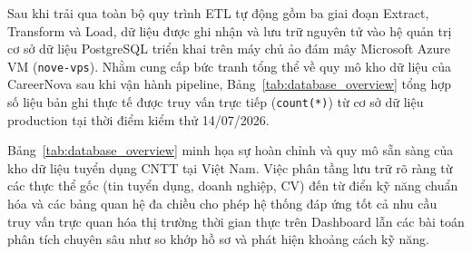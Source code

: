 Sau khi trải qua toàn bộ quy trình ETL tự động gồm ba giai đoạn Extract, Transform và Load, dữ liệu được ghi nhận và lưu trữ nguyên tử vào hệ quản trị cơ sở dữ liệu PostgreSQL triển khai trên máy chủ ảo đám mây Microsoft Azure VM (\texttt{nove-vps}). Nhằm cung cấp bức tranh tổng thể về quy mô kho dữ liệu của CareerNova sau khi vận hành pipeline, Bảng~\ref{tab:database_overview} tổng hợp số liệu bản ghi thực tế được truy vấn trực tiếp (\texttt{count(*)}) từ cơ sở dữ liệu production tại thời điểm kiểm thử 14/07/2026.


\begin{table}[H]
\caption{Bảng tổng hợp quy mô và tình hình dữ liệu trong kho PostgreSQL trên máy chủ Azure}
\label{tab:database_overview}
\begin{center}
\end{center}
\end{table}


Bảng~\ref{tab:database_overview} minh họa sự hoàn chỉnh và quy mô sẵn sàng của kho dữ liệu tuyển dụng CNTT tại Việt Nam. Việc phân tầng lưu trữ rõ ràng từ các thực thể gốc (tin tuyển dụng, doanh nghiệp, CV) đến từ điển kỹ năng chuẩn hóa và các bảng quan hệ đa chiều cho phép hệ thống đáp ứng tốt cả nhu cầu truy vấn trực quan hóa thị trường thời gian thực trên Dashboard lẫn các bài toán phân tích chuyên sâu như so khớp hồ sơ và phát hiện khoảng cách kỹ năng.

